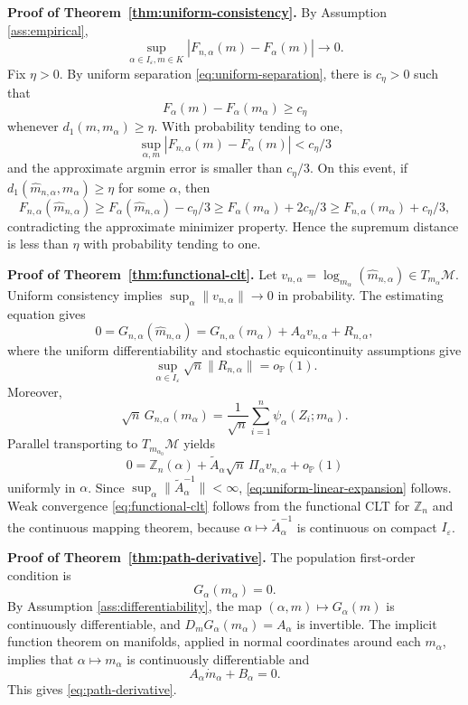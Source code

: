 \documentclass[11pt]{article}
\newcommand{\M}{\mathcal M}
\newcommand{\Pbb}{\mathbb P}
\newcommand{\eps}{\varepsilon}
\newcommand{\1}{\mathbf{1}}
\begin{document}
\medskip 
\noindent \textbf{Proof of Theorem~\ref{thm:uniform-consistency}.}
By Assumption \ref{ass:empirical},
\[
 \sup_{\alpha\in I_\eps,m\in K}|F_{n,\alpha}(m)-F_\alpha(m)|\to0.
\]
Fix $\eta>0$.  By uniform separation \eqref{eq:uniform-separation}, there is $c_\eta>0$ such that
\[
 F_\alpha(m)-F_\alpha(m_\alpha)\ge c_\eta
\]
whenever $d_1(m,m_\alpha)\ge\eta$.  With probability tending to one,
\[
 \sup_{\alpha,m}|F_{n,\alpha}(m)-F_\alpha(m)|<c_\eta/3
\]
and the approximate argmin error is smaller than $c_\eta/3$.  On this event, if $d_1(\widehat m_{n,\alpha},m_\alpha)\ge\eta$ for some $\alpha$, then
\[
 F_{n,\alpha}(\widehat m_{n,\alpha})
 \ge F_\alpha(\widehat m_{n,\alpha})-c_\eta/3
 \ge F_\alpha(m_\alpha)+2c_\eta/3
 \ge F_{n,\alpha}(m_\alpha)+c_\eta/3,
\]
contradicting the approximate minimizer property.  Hence the supremum distance is less than $\eta$ with probability tending to one.

\medskip
\noindent \textbf{Proof of Theorem~\ref{thm:functional-clt}.}
Let
$
 v_{n,\alpha}=\log_{m_\alpha}(\widehat m_{n,\alpha})\in T_{m_\alpha}\M.
$
Uniform consistency implies $\sup_\alpha\|v_{n,\alpha}\|\to0$ in probability.  The estimating equation gives
\[
 0=G_{n,\alpha}(\widehat m_{n,\alpha})
 =G_{n,\alpha}(m_\alpha)+A_\alpha v_{n,\alpha}+R_{n,\alpha},
\]
where the uniform differentiability and stochastic equicontinuity assumptions give
\[
 \sup_{\alpha\in I_\eps}\sqrt n\|R_{n,\alpha}\|=o_{\Pbb}(1).
\]
Moreover,
\[
 \sqrt n\,G_{n,\alpha}(m_\alpha)
 =\frac1{\sqrt n}\sum_{i=1}^n\psi_\alpha(Z_i;m_\alpha).
\]
Parallel transporting to $T_{m_{\alpha_0}}\M$ yields
\[
 0=
 \mathbb Z_n(\alpha)
 +\widetilde A_\alpha\sqrt n\,\Pi_\alpha v_{n,\alpha}
 +o_{\Pbb}(1)
\]
uniformly in $\alpha$.  Since $\sup_\alpha\|\widetilde A_\alpha^{-1}\|<\infty$, \eqref{eq:uniform-linear-expansion} follows.  Weak convergence \eqref{eq:functional-clt} follows from the functional CLT for $\mathbb Z_n$ and the continuous mapping theorem, because $\alpha\mapsto \widetilde A_\alpha^{-1}$ is continuous on compact $I_\eps$.


\medskip
\noindent \textbf{Proof of Theorem~\ref{thm:path-derivative}.}
The population first-order condition is
\[
 G_\alpha(m_\alpha)=0.
\]
By Assumption \ref{ass:differentiability}, the map $(\alpha,m)\mapsto G_\alpha(m)$ is continuously differentiable, and $D_mG_\alpha(m_\alpha)=A_\alpha$ is invertible.  The implicit function theorem on manifolds, applied in normal coordinates around each $m_\alpha$, implies that $\alpha\mapsto m_\alpha$ is continuously differentiable and
\[
 A_\alpha\dot m_\alpha+B_\alpha=0.
\]
This gives \eqref{eq:path-derivative}.
\end{document}
